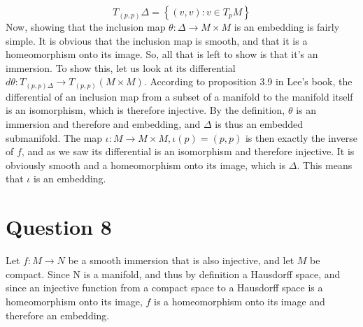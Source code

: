 \documentclass{article}
\begin{document}
\begin{equation}
    T_{(p,p)}\Delta = \left\{(v,v) : v \in T_pM\right\}
\end{equation}
Now, showing that the inclusion map $\theta: \Delta \rightarrow M \times M$ is an embedding is fairly simple. It is obvious that the inclusion map is smooth, and that it is a homeomorphism onto its image. So, all that is left to show is that it's an immersion. To show this, let us look at its differential $d\theta: T_{(p,p)\Delta} \rightarrow T_{(p,p)}(M \times M)$. According to proposition 3.9 in Lee's book, the differential of an inclusion map from a subset of a manifold to the manifold itself is an isomorphism, which is therefore injective. By the definition, $\theta$ is an immersion and therefore and embedding, and $\Delta$ is thus an embedded submanifold.
\newline
The map $\iota: M \rightarrow M \times M, \iota(p) = (p,p)$ is then exactly the inverse of $f$, and as we saw its differential is an isomorphism and therefore injective. It is obviously smooth and a homeomorphism onto its image, which is $\Delta$. This means that $\iota$ is an embedding.

\section*{Question 8}
Let $f : M \rightarrow N$ be a smooth immersion that is also injective, and let $M$ be compact. Since N is a manifold, and thus by definition a Hausdorff space, and since an injective function from a compact space to a Hausdorff space is a homeomorphism onto its image, $f$ is a homeomorphism onto its image and therefore an embedding.
\end{document}

